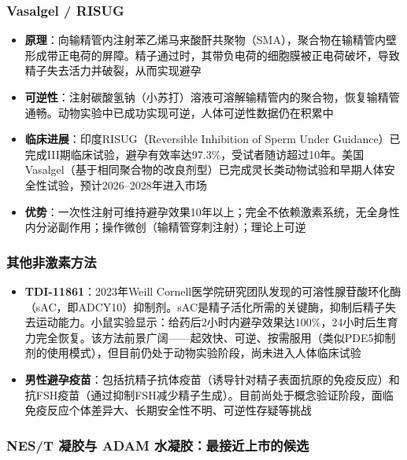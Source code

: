 \subsubsection{Vasalgel / RISUG}

\begin{itemize}[leftmargin=2cm]
	\item \textbf{原理}：向输精管内注射苯乙烯马来酸酐共聚物（SMA），聚合物在输精管内壁形成带正电荷的屏障。精子通过时，其带负电荷的细胞膜被正电荷破坏，导致精子失去活力并破裂，从而实现避孕
	\item \textbf{可逆性}：注射碳酸氢钠（小苏打）溶液可溶解输精管内的聚合物，恢复输精管通畅。动物实验中已成功实现可逆，人体可逆性数据仍在积累中
	\item \textbf{临床进展}：印度RISUG（Reversible Inhibition of Sperm Under Guidance）已完成III期临床试验，避孕有效率达97.3\%，受试者随访超过10年。美国Vasalgel（基于相同聚合物的改良剂型）已完成灵长类动物试验和早期人体安全性试验，预计2026--2028年进入市场
	\item \textbf{优势}：一次性注射可维持避孕效果10年以上；完全不依赖激素系统，无全身性内分泌副作用；操作微创（输精管穿刺注射）；理论上可逆
\end{itemize}

\subsubsection{其他非激素方法}

\begin{itemize}[leftmargin=2cm]
	\item \textbf{TDI-11861}：2023年Weill Cornell医学院研究团队发现的可溶性腺苷酸环化酶（sAC，即ADCY10）抑制剂。sAC是精子活化所需的关键酶，抑制后精子失去运动能力。小鼠实验显示：给药后2小时内避孕效果达100\%，24小时后生育力完全恢复。该方法前景广阔——起效快、可逆、按需服用（类似PDE5抑制剂的使用模式），但目前仍处于动物实验阶段，尚未进入人体临床试验
	\item \textbf{男性避孕疫苗}：包括抗精子抗体疫苗（诱导针对精子表面抗原的免疫反应）和抗FSH疫苗（通过抑制FSH减少精子生成）。目前尚处于概念验证阶段，面临免疫反应个体差异大、长期安全性不明、可逆性存疑等挑战
\end{itemize}

\subsubsection{NES/T 凝胶与 ADAM 水凝胶：最接近上市的候选}

